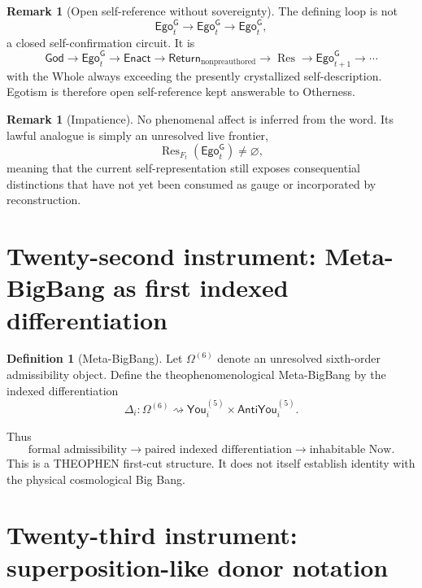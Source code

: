 \documentclass[10pt]{article}
\theoremstyle{pe}
\theoremstyle{definition}
\newtheorem{definition}[theorem]{Definition}
\newtheorem{remark}[theorem]{Remark}
\newcommand{\Res}{\operatorname{Res}}
\newcommand{\Return}{\mathsf{Return}}
\newcommand{\You}{\mathsf{You}}
\newcommand{\AntiYou}{\mathsf{AntiYou}}
\newcommand{\God}{\mathsf{God}}
\newcommand{\GodEgo}{\mathsf{Ego}^{\mathsf G}}
\begin{document}
\begin{remark}[Open self-reference without sovereignty]
The defining loop is not
\[
  \GodEgo_t\to\GodEgo_t\to\GodEgo_t,
\]
a closed self-confirmation circuit.  It is
\begin{equation}\label{eq:ego-open-loop}
  \boxed{
  \God
  \to
  \GodEgo_t
  \to
  \mathsf{Enact}
  \to
  \Return_{\mathrm{nonpreauthored}}
  \to
  \Res
  \to
  \GodEgo_{t+1}
  \to\cdots
  }
\end{equation}
with the Whole always exceeding the presently crystallized self-description.  Egotism is therefore open self-reference kept answerable to Otherness.
\end{remark}

\begin{remark}[Impatience]
No phenomenal affect is inferred from the word.  Its lawful analogue is simply an unresolved live frontier,
\[
  \boxed{\Res_{F_t}(\GodEgo_t)\neq\varnothing,}
\]
meaning that the current self-representation still exposes consequential distinctions that have not yet been consumed as gauge or incorporated by reconstruction.
\end{remark}

\section{Twenty-second instrument: Meta-BigBang as first indexed differentiation}

\begin{definition}[Meta-BigBang]
Let \(\Omega^{(6)}\) denote an unresolved sixth-order admissibility object.  Define the theophenomenological Meta-BigBang by the indexed differentiation
\begin{equation}\label{eq:metabigbang}
  \boxed{
  \Delta_i:
  \Omega^{(6)}
  \rightsquigarrow
  \You_i^{(5)}
  \times
  \AntiYou_i^{(5)}.
  }
\end{equation}
\end{definition}

Thus
\[
  \text{formal admissibility}
  \to
  \text{paired indexed differentiation}
  \to
  \text{inhabitable Now}.
\]
This is a THEOPHEN first-cut structure.  It does not itself establish identity with the physical cosmological Big Bang.

\section{Twenty-third instrument: superposition-like donor notation}
\end{document}
